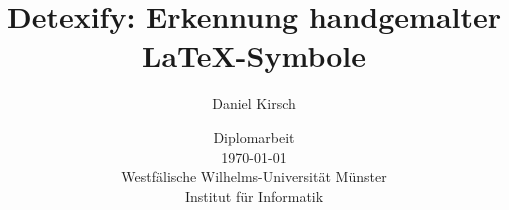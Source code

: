 \documentclass[12pt]{book}
\begin{document}
\frontmatter

\title{Detexify: Erkennung handgemalter \LaTeX-Symbole}

\author{Daniel Kirsch}

\date{\vspace{10mm} Diplomarbeit\\ \vspace{3mm} \today \\
\vspace{20mm}
\vspace{3mm} Westfälische Wilhelms-Universität Münster\\Institut für Informatik}

\maketitle


\rule{0mm}{1mm}
\newpage
\rule{0mm}{1mm}
\newpage


\listoffigures    %
\listoftables     %
\tableofcontents  %


\mainmatter




\appendix



\backmatter



\end{document}
